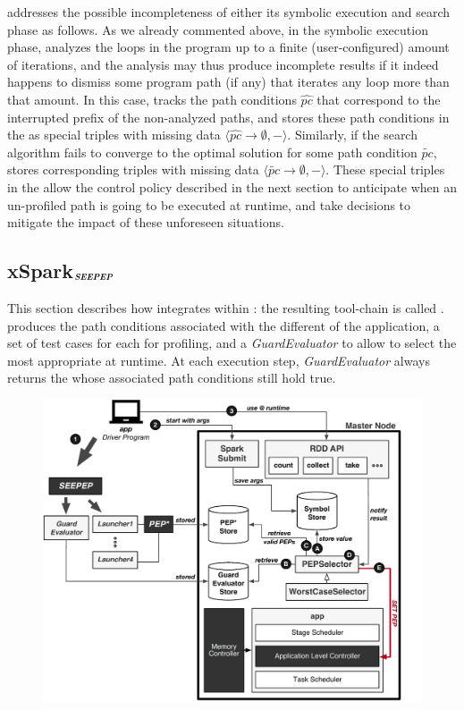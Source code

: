 \approach addresses the possible incompleteness of either its symbolic execution and search phase as follows. As we already commented above, in the symbolic execution phase, \approach analyzes the loops in the program up to a finite (user-configured) amount of iterations, and the analysis may thus produce incomplete results if it indeed happens to dismiss some program path (if any) that iterates any loop more than that amount. In this case, \approach tracks the path conditions $\hat{pc}$ that correspond to the interrupted prefix of the non-analyzed paths, and stores these path conditions in the \model as special triples with missing data \(\langle \hat{pc} \rightarrow \emptyset, -\rangle\).  Similarly, if the search algorithm fails to converge to the optimal solution for some path condition $\tilde{pc}$, \approach stores corresponding triples with missing data \(\langle \tilde{pc} \rightarrow \emptyset, -\rangle\). These special triples in the \model allow the control policy described in the next section to anticipate when an un-profiled path is going to be executed at runtime, and take decisions to mitigate the impact of these unforeseen situations. 


\subsection{xSpark$_{\text{\textit{\textbf{SEEPEP}}}}$}
This section describes how \dSymb integrates within \cSpark: the resulting tool-chain is called \tool. \dSymb produces the path conditions associated with the different \plans of the application, a set of test cases for each \plan for profiling, and a \textit{GuardEvaluator} to allow \cSpark to select the most appropriate \plan at runtime. At each execution step, \textit{GuardEvaluator} always returns the \plans whose associated path conditions still hold true. 

\begin{figure}[tbhp]
	\centering
	\includegraphics[width=\columnwidth]{images/xsparksymb}
	\caption{\tool}
	\label{fig:xsparkdagsymb}
\end{figure}

